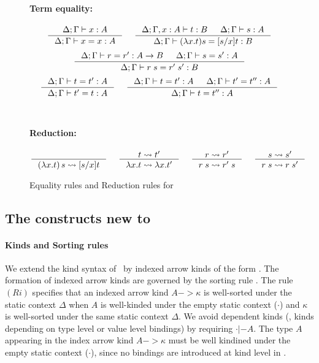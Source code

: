 \begin{figure}
\begin{framed}
\paragraph{Term equality:} 
\[ \inference{\Delta;\Gamma |- x:A}{\Delta;\Gamma |- x=x:A}
 ~~~~
   \inference{\Delta;\Gamma,x:A |- t:B & \Delta;\Gamma |- s:A}
             {\Delta;\Gamma |- (\lambda x.t)s=[s/x]t : B}
\]
\[ \inference{\Delta;\Gamma |- r=r':A-> B & \Delta;\Gamma |- s=s':A}
             {\Delta;\Gamma |- r\;s=r'\;s':B}
\]
\[ \inference{\Delta;\Gamma |- t=t':A}{\Delta;\Gamma |- t'=t:A}
 ~~~~
   \inference{\Delta;\Gamma |- t=t':A & \Delta;\Gamma |- t'=t'':A}
             {\Delta;\Gamma |- t=t'':A}
\]
~\\
\paragraph{Reduction:} 
\[ \inference{}{(\lambda x.t)\,s \rightsquigarrow [s/x]t}
 ~~~~
   \inference{t \rightsquigarrow t'}{\lambda x.t \rightsquigarrow \lambda x.t'}
 ~~~~
   \inference{r \rightsquigarrow r'}{r\;s \rightsquigarrow r'\;s}
 ~~~~
   \inference{s \rightsquigarrow s'}{r\;s \rightsquigarrow r\;s'}
\]
\end{framed}
\caption{Equality rules and Reduction rules for \Fi}
\label{fig:eqFi}
\end{figure}

\subsection{The constructs new to \Fi}
\paragraph{Kinds and Sorting rules}
We extend the kind syntax of \Fw\ by indexed arrow kinds of the form
. The formation of indexed arrow kinds are
governed by the sorting rule .
The rule $(Ri)$ specifies that an indexed arrow kind $A -> \kappa$
is well-sorted under the static context $\Delta$
when $A$ is well-kinded under the empty static context ($\cdot$) 
and $\kappa$ is well-sorted under the same static context $\Delta$.
We avoid dependent kinds (\ie, kinds depending on type level or
value level bindings) by requiring $\cdot |- A$. The type $A$ appearing
in the index arrow kind $A -> \kappa$ must be well kindined under
the empty static context ($\cdot$), since no bindings are introduced
at kind level in \Fi.

